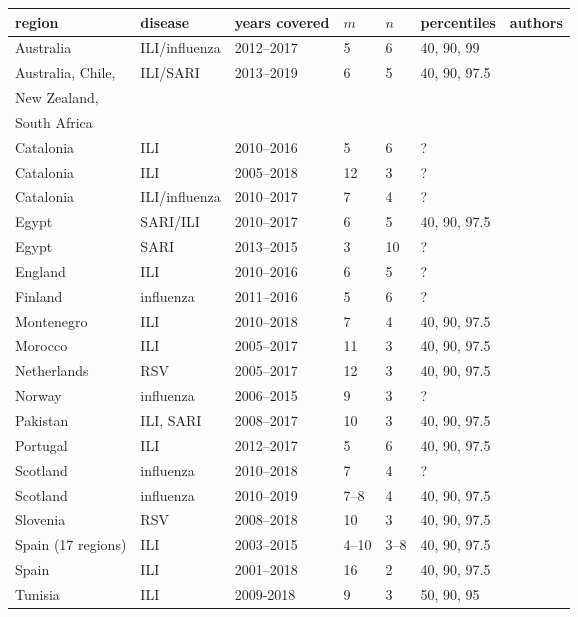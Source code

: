 \documentclass{article}
\begin{document}
\begin{table}[h!]
\begin{tabular}{l l l l l l l}
\toprule
region & disease & years covered & $m$ & $n$ & percentiles & authors\\
\midrule
Australia & ILI/influenza & 2012--2017 & 5 & 6 & 40, 90, 99 & \cite{Vette2018}\\
Australia, Chile, & ILI/SARI & 2013--2019 & 6 & 5 & 40, 90, 97.5 & \cite{Sullivan2019}\\
New Zealand,\\
South Africa\\
Catalonia & ILI & 2010--2016 & 5 & 6 & ? & \cite{Basile2018}\\
Catalonia & ILI & 2005--2018 & 12 & 3 & ? & \cite{Basile2019}\\
Catalonia & ILI/influenza & 2010--2017 & 7 & 4 & ? & \cite{Torner2019}\\
Egypt & SARI/ILI & 2010--2017 & 6 & 5 & 40, 90, 97.5 & \cite{AbdElGawad2020}\\
Egypt & SARI & 2013--2015 & 3 & 10 & ? & \cite{Elhakim2019}\\
England & ILI & 2010--2016 & 6 & 5 & ? & \cite{Wagner2018}\\
Finland & influenza & 2011--2016 & 5 & 6 & ? & \cite{Pesaelae2019}\\
Montenegro & ILI & 2010--2018 & 7 & 4 & 40, 90, 97.5 & \cite{Rakocevic2019}\\
Morocco & ILI & 2005--2017 & 11 & 3 & 40, 90, 97.5 & \cite{Rguig2020}\\
Netherlands & RSV & 2005--2017 & 12 & 3 & 40, 90, 97.5 & \cite{Vos2019}\\
Norway & influenza & 2006--2015 & 9 & 3 & ? & \cite{Benedetti2019}\\
Pakistan & ILI, SARI & 2008--2017 & 10 & 3 & 40, 90, 97.5 & \cite{Nisar2020}\\
Portugal & ILI & 2012--2017 & 5 & 6 & 40, 90, 97.5 & \cite{Pascoa2018}\\
Scotland & influenza & 2010--2018 & 7 & 4 & ? & \cite{Murray2018}\\
Scotland & influenza & 2010--2019 & 7--8 & 4 & 40, 90, 97.5 & \cite{Dickson2020}\\
Slovenia & RSV & 2008--2018 & 10 & 3 & 40, 90, 97.5 & \cite{Grilc2021}\\
Spain (17 regions) & ILI & 2003--2015 & 4--10 & 3--8 & 40, 90, 97.5 & \cite{Bangert2017}\\
Spain & ILI & 2001--2018 & 16 & 2 & 40, 90, 97.5 & \cite{RedondoBravo2020}\\
Tunisia & ILI & 2009-2018 & 9 & 3 & 50, 90, 95 & \cite{Bouguerra2020}\\

\end{tabular}
\end{table}
\end{document}
